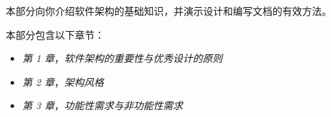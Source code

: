 本部分向你介绍软件架构的基础知识，并演示设计和编写文档的有效方法。

本部分包含以下章节：

\begin{itemize}
\item \emph{第 1 章}，\emph{软件架构的重要性与优秀设计的原则}
\item \emph{第 2 章}，\emph{架构风格}
\item \emph{第 3 章}，\emph{功能性需求与非功能性需求}
\end{itemize}
